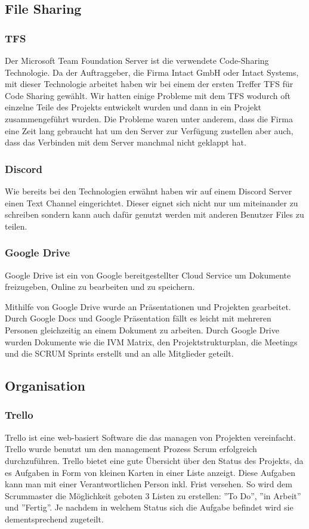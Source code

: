 \subsection{File Sharing}
\label{sec:FileSharing}
\subsubsection {TFS}
\label{sec:TFS}
Der Microsoft Team Foundation Server ist die verwendete Code-Sharing Technologie. Da der Auftraggeber, die Firma Intact GmbH oder Intact Systems, mit dieser Technologie arbeitet haben wir bei einem der ersten Treffer TFS für Code Sharing gewählt. Wir hatten einige Probleme mit dem TFS wodurch oft einzelne Teile des Projekts entwickelt wurden und dann in ein Projekt zusammengeführt wurden. Die Probleme waren unter anderem, dass die Firma eine Zeit lang gebraucht hat um den Server zur Verfügung zustellen aber auch, dass das Verbinden mit dem Server manchmal nicht geklappt hat. 


\subsubsection {Discord}
\label{sec:Discord}
Wie bereits bei den Technologien erwähnt haben wir auf einem Discord Server einen Text Channel eingerichtet. Dieser eignet sich nicht nur um miteinander zu schreiben sondern kann auch dafür genutzt werden mit anderen Benutzer Files zu teilen. 
\subsubsection {Google Drive}
\label{sec:GoogleDrive}
Google Drive ist ein von Google bereitgestellter Cloud Service um Dokumente freizugeben, Online zu bearbeiten und zu speichern.

Mithilfe von Google Drive wurde an Präsentationen und Projekten gearbeitet. Durch Google Docs und Google Präsentation fällt es leicht mit mehreren Personen gleichzeitig an einem Dokument zu arbeiten. Durch Google Drive wurden Dokumente wie die IVM Matrix, den Projektstrukturplan, die Meetings und die SCRUM Sprints erstellt und an alle Mitglieder geteilt. 
\subsection{Organisation}
\label{sec:Organisation}
\subsubsection {Trello}
\label{sec:Trello}
Trello ist eine web-basiert Software die das managen von Projekten vereinfacht. Trello wurde benutzt um den management Prozess Scrum erfolgreich durchzuführen. Trello bietet eine gute Übersicht über den Status des Projekts, da es Aufgaben in Form von kleinen Karten in einer Liste anzeigt. Diese Aufgaben kann man mit einer Verantwortlichen Person inkl. Frist versehen. So wird dem Scrummaster die Möglichkeit geboten 3 Listen zu erstellen: ''To Do'', ''in Arbeit'' und ''Fertig''. Je nachdem in welchem Status sich die Aufgabe befindet wird sie dementsprechend zugeteilt.

